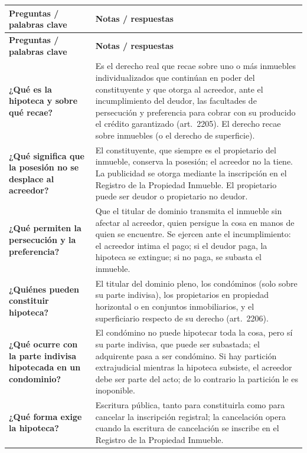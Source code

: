 \documentclass[12pt,oneside]{book}
\begin{document}
\begin{longtable}{p{}p{}}
\toprule
\textbf{Preguntas / palabras clave} & \textbf{Notas / respuestas} \\
\midrule
\endfirsthead
\toprule
\textbf{Preguntas / palabras clave} & \textbf{Notas / respuestas} \\
\midrule
\endhead

\textbf{¿Qué es la hipoteca y sobre qué recae?} &
Es el derecho real que recae sobre uno o más inmuebles individualizados que continúan en poder del constituyente y que otorga al acreedor, ante el incumplimiento del deudor, las facultades de persecución y preferencia para cobrar con su producido el crédito garantizado (art.\ 2205). El derecho recae sobre inmuebles (o el derecho de superficie). \\[0.6em]

\textbf{¿Qué significa que la posesión no se desplace al acreedor?} &
El constituyente, que siempre es el propietario del inmueble, conserva la posesión; el acreedor no la tiene. La publicidad se otorga mediante la inscripción en el Registro de la Propiedad Inmueble. El propietario puede ser deudor o propietario no deudor. \\[0.6em]

\textbf{¿Qué permiten la persecución y la preferencia?} &
Que el titular de dominio transmita el inmueble sin afectar al acreedor, quien persigue la cosa en manos de quien se encuentre. Se ejercen ante el incumplimiento: el acreedor intima el pago; si el deudor paga, la hipoteca se extingue; si no paga, se subasta el inmueble. \\[0.6em]

\textbf{¿Quiénes pueden constituir hipoteca?} &
El titular del dominio pleno, los condóminos (solo sobre su parte indivisa), los propietarios en propiedad horizontal o en conjuntos inmobiliarios, y el superficiario respecto de su derecho (art.\ 2206). \\[0.6em]

\textbf{¿Qué ocurre con la parte indivisa hipotecada en un condominio?} &
El condómino no puede hipotecar toda la cosa, pero sí su parte indivisa, que puede ser subastada; el adquirente pasa a ser condómino. Si hay partición extrajudicial mientras la hipoteca subsiste, el acreedor debe ser parte del acto; de lo contrario la partición le es inoponible. \\[0.6em]

\textbf{¿Qué forma exige la hipoteca?} &
Escritura pública, tanto para constituirla como para cancelar la inscripción registral; la cancelación opera cuando la escritura de cancelación se inscribe en el Registro de la Propiedad Inmueble. \\[0.6em]


\end{longtable}
\end{document}

